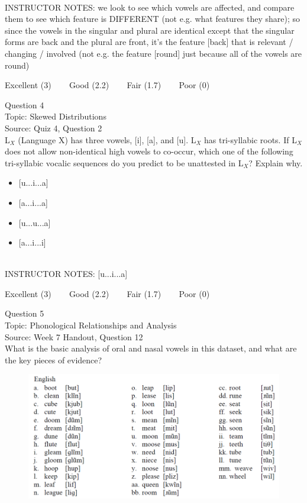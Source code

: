 \documentclass[12pt]{article}
\begin{document}
~\\
INSTRUCTOR NOTES: we look to see which vowels are affected, and compare them to see which feature is DIFFERENT (not e.g. what features they share); so since the vowels in the singular and plural are identical except that the singular forms are back and the plural are front, it's the feature [back] that is relevant / changing / involved (not e.g. the feature [round] just because all of the vowels are round)


\vfill
Excellent (3) ~~~ Good (2.2) ~~~ Fair (1.7) ~~~ Poor (0)
\newpage

{\large Question 4}\\

Topic: Skewed Distributions\\
Source: Quiz 4, Question 2\\

L$_X$ (Language X) has three vowels, [i], [a], and [u]. L$_X$ has tri-syllabic roots. If L$_X$ does not allow non-identical high vowels to co-occur, which one of the following tri-syllabic vocalic sequences do you predict to be unattested in L$_X$? Explain why.\\

\begin{itemize} \item {[u...i...a]} \item {[a...i...a]} \item {[u...u...a]} \item {[a...i...i]} \end{itemize}


~\\
INSTRUCTOR NOTES: [u...i...a]


\vfill
Excellent (3) ~~~ Good (2.2) ~~~ Fair (1.7) ~~~ Poor (0)
\newpage

{\large Question 5}\\

Topic: Phonological Relationships and Analysis\\
Source: Week 7 Handout, Question 12\\

What is the basic analysis of oral and nasal vowels in this dataset, and what are the key pieces of evidence?\\

\begin{figure}[H]
\includegraphics{../images/english12.png}
\end{figure}
\end{document}
